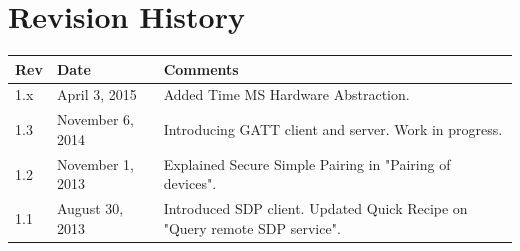 \documentclass[a4paper,titlepage,oneside,12pt]{amsart} %
\begin{document}
\pagebreak

\appendix
	    
	

\pagebreak

\section{Revision History}
\label{appendix:revision_history}

\begin{table}[!htbp]
\begin{tabular*}{\textwidth}{lp{3.5cm}p{8.5cm}}\toprule
Rev & Date & Comments\\ 
\midrule
1.x & April 3, 2015 & Added Time MS Hardware Abstraction.\\
1.3 & November 6, 2014 & Introducing GATT client and server. Work in progress.\\
1.2 & November 1, 2013 & Explained Secure Simple Pairing in "Pairing of devices".\\
1.1 & August 30, 2013 & Introduced SDP client. Updated Quick Recipe on "Query remote SDP service".\\
\bottomrule
\end{tabular*}
\end{table}

%
%


% 
% 


\end{document}
